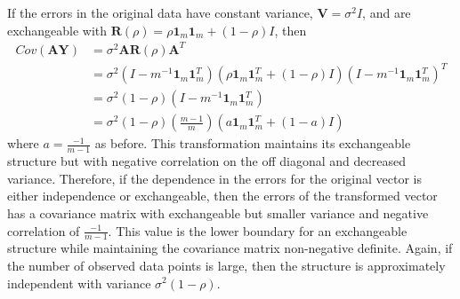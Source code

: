 \documentclass[12pt]{article}
\newcommand{\B}[0]{\mathbf}
\begin{document}
 If the errors in the original data have constant variance, $\B V=\sigma^{2}I$, and are exchangeable with $\B R(\rho) = \rho\B 1_{m} \B 1_{m} + (1-\rho) I$, then 
 \begin{align*}
 Cov(\B A\B Y) &= \sigma^{2}\B A\B R(\rho)\B A^{T}\\
 &= \sigma^{2}(I-m^{-1}\B1_{m}\B1_{m}^{T})(\rho\B1_{m}\B1_{m}^{T}+(1-\rho)I)(I-m^{-1}\B1_{m}\B1_{m}^{T})^{T}\\
 &= \sigma^{2}(1-\rho)(I-m^{-1}\B1_{m}\B1_{m}^{T})\\
 &=\sigma^{2}(1-\rho)\left(\frac{m-1}{m}\right)(a\B 1_{m}\B 1_{m}^{T}+ (1-a)I)
 \end{align*} 
 where $a=\frac{-1}{m-1}$ as before. This transformation maintains its exchangeable structure but with negative correlation on the off diagonal and decreased variance. Therefore, if the dependence in the errors for the original vector is either independence or exchangeable, then the errors of the transformed vector has a covariance matrix with exchangeable but smaller variance and negative correlation of $\frac{-1}{m-1}$. This value is the lower boundary for an exchangeable structure while maintaining the covariance matrix non-negative definite. Again, if the number of observed data points is large, then the structure is approximately independent with variance $\sigma^{2}(1-\rho)$.\\
 
\end{document}
